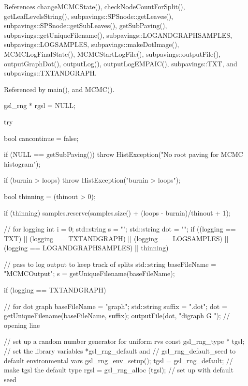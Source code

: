 \-References change\-M\-C\-M\-C\-State(), check\-Node\-Count\-For\-Split(), get\-Leaf\-Levels\-String(), subpavings\-::\-S\-P\-Snode\-::get\-Leaves(), subpavings\-::\-S\-P\-Snode\-::get\-Sub\-Leaves(), get\-Sub\-Paving(), subpavings\-::get\-Unique\-Filename(), subpavings\-::\-L\-O\-G\-A\-N\-D\-G\-R\-A\-P\-H\-S\-A\-M\-P\-L\-E\-S, subpavings\-::\-L\-O\-G\-S\-A\-M\-P\-L\-E\-S, subpavings\-::make\-Dot\-Image(), \-M\-C\-M\-C\-Log\-Final\-State(), \-M\-C\-M\-C\-Start\-Log\-File(), subpavings\-::output\-File(), output\-Graph\-Dot(), output\-Log(), output\-Log\-E\-M\-P\-A\-I\-C(), subpavings\-::\-T\-X\-T, and subpavings\-::\-T\-X\-T\-A\-N\-D\-G\-R\-A\-P\-H.



\-Referenced by main(), and \-M\-C\-M\-C().


\begin{DoxyCode}
{
  
    gsl_rng * rgsl = NULL;

    try {
    
    bool cancontinue = false;

    if (NULL == getSubPaving()) {
      throw HistException("No root paving for MCMC histogram");
    }
    
    if (burnin > loops) {
      throw HistException("burnin > loops");
    }
    
    bool thinning = (thinout > 0);
  
    if (thinning) {
      samples.reserve(samples.size() + (loops - burnin)/thinout + 1);
    }

        // for logging
        int i = 0;
        std::string s = "";
        std::string dot = "";
        if ((logging == TXT) || (logging == TXTANDGRAPH)
                || (logging == LOGSAMPLES) || (logging == LOGANDGRAPHSAMPLES)
        || thinning) {

            // pass to log output to keep track of splits
            std::string baseFileName = "MCMCOutput";
            s = getUniqueFilename(baseFileName);

            if (logging == TXTANDGRAPH) {

                // for dot graph
                baseFileName = "graph";
                std::string suffix = ".dot";
                dot = getUniqueFilename(baseFileName, suffix);
                outputFile(dot, "digraph G {"); // opening line
            }
        }

        // set up a random number generator for uniform rvs
        const gsl_rng_type * tgsl;
        // set the library variables *gsl_rng_default and
        // gsl_rng_default_seed to default environmental vars
        gsl_rng_env_setup();
        tgsl = gsl_rng_default; // make tgsl the default type
        rgsl = gsl_rng_alloc (tgsl); // set up with default seed

}}}
\end{DoxyCode}

